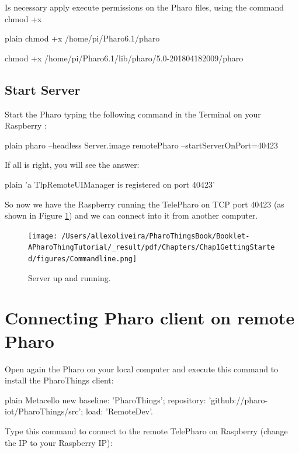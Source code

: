 \documentclass[10pt,twoside,english]{_support/latex/sbabook/sbabook}
\begin{document}
Is necessary apply execute permissions on the Pharo files, using the command chmod +x

\begin{displaycode}{plain}
chmod +x /home/pi/Pharo6.1/pharo

chmod +x /home/pi/Pharo6.1/lib/pharo/5.0-201804182009/pharo
\end{displaycode}
\subsection{Start Server}
Start the Pharo typing the following command in the Terminal on your Raspberry :

\begin{displaycode}{plain}
pharo --headless Server.image remotePharo --startServerOnPort=40423
\end{displaycode}

If all is right, you will see the answer:

\begin{displaycode}{plain}
'a TlpRemoteUIManager is registered on port 40423'
\end{displaycode}

So now we have the Raspberry running the TelePharo on TCP port 40423 (as shown in Figure \ref{Commandline}) and we can connect into it from another computer.


\begin{figure}

\begin{center}
\texttt{[image: /Users/allexoliveira/PharoThingsBook/Booklet-APharoThingTutorial/\_result/pdf/Chapters/Chap1GettingStarted/figures/Commandline.png]}\caption{Server up and running.\label{Commandline}}\end{center}
\end{figure}

\section{Connecting Pharo client on remote Pharo}
Open again the Pharo on your local computer and execute this command to install the PharoThings client:

\begin{displaycode}{plain}
Metacello new
baseline: 'PharoThings';
repository: 'github://pharo-iot/PharoThings/src';
load: 'RemoteDev'.
\end{displaycode}

Type this command to connect to the remote TelePharo on Raspberry (change the IP to your Raspberry IP):
\end{document}
